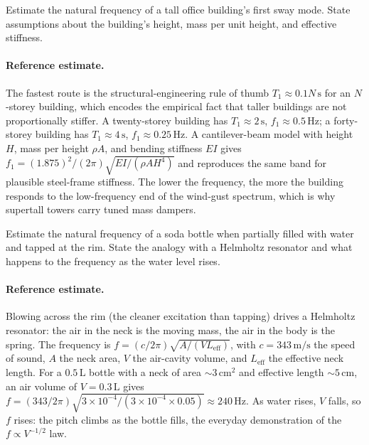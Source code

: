 \begin{exercise}
Estimate the natural frequency of a tall office building's first
sway mode. State assumptions about the building's height, mass per
unit height, and effective stiffness.

\paragraph{Reference estimate.} The fastest route is the
structural-engineering rule of thumb $T_1 \approx 0.1 N\,\si{\second}$
for an $N$-storey building, which encodes the empirical fact that
taller buildings are not proportionally stiffer. A twenty-storey
building has $T_1 \approx 2\,\si{\second}$, $f_1 \approx 0.5\,\si{
\hertz}$; a forty-storey building has $T_1 \approx 4\,\si{\second}$,
$f_1 \approx 0.25\,\si{\hertz}$. A cantilever-beam model with height
$H$, mass per height $\rho A$, and bending stiffness $EI$ gives $f_1 =
(1.875)^2/(2\pi)\sqrt{EI/(\rho A H^4)}$ and reproduces the same band
for plausible steel-frame stiffness. The lower the frequency, the more
the building responds to the low-frequency end of the wind-gust
spectrum, which is why supertall towers carry tuned mass dampers.
\end{exercise}

\begin{exercise}
Estimate the natural frequency of a soda bottle when partially
filled with water and tapped at the rim. State the analogy with a
Helmholtz resonator and what happens to the frequency as the water
level rises.

\paragraph{Reference estimate.} Blowing across the rim (the cleaner
excitation than tapping) drives a Helmholtz resonator: the air in the
neck is the moving mass, the air in the body is the spring. The
frequency is $f = (c/2\pi)\sqrt{A/(V L_{\text{eff}})}$, with $c =
343\,\si{\meter\per\second}$ the speed of sound, $A$ the neck area,
$V$ the air-cavity volume, and $L_{\text{eff}}$ the effective neck
length. For a $0.5\,\si{\liter}$ bottle with a neck of area $\sim 3\,
\si{\centi\meter\squared}$ and effective length $\sim 5\,\si{\centi
\meter}$, an air volume of $V = 0.3\,\si{\liter}$ gives $f =
(343/2\pi)\sqrt{3\times 10^{-4}/(3\times 10^{-4} \times 0.05)} \approx
240\,\si{\hertz}$. As water rises, $V$ falls, so $f$ rises: the pitch
climbs as the bottle fills, the everyday demonstration of the
$f \propto V^{-1/2}$ law.
\end{exercise}

